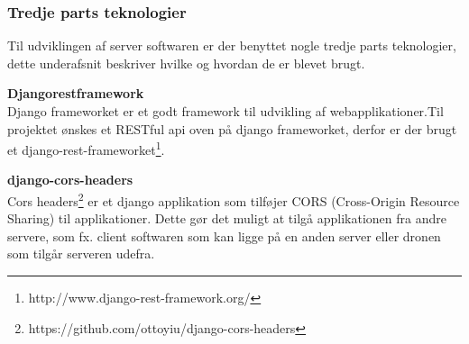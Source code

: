 \vspace{1cm}

\subsubsection*{Tredje parts teknologier}
Til udviklingen af server softwaren er der benyttet nogle tredje parts teknologier, dette underafsnit beskriver hvilke og hvordan de er blevet brugt.

\textbf{Djangorestframework}\\
Django frameworket er et godt framework til udvikling af webapplikationer.Til projektet ønskes et RESTful api oven på django frameworket, derfor er der brugt et django-rest-frameworket\footnote{http://www.django-rest-framework.org/}. 

\textbf{django-cors-headers}\\
Cors headers\footnote{https://github.com/ottoyiu/django-cors-headers} er et django applikation som tilføjer CORS (Cross-Origin Resource Sharing) til applikationer. Dette gør det muligt at tilgå applikationen fra andre servere, som fx.  client softwaren som kan ligge på en anden server eller dronen som tilgår serveren udefra. 

\newpage